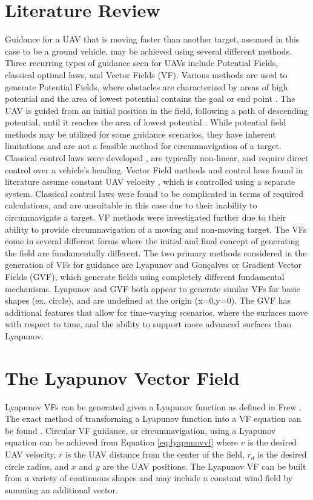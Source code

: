 \documentclass[conf]{new-aiaa}
\begin{document}
\section{Literature Review}
Guidance for a UAV that is moving faster than another target, assumed in this case to be a ground vehicle, may be achieved using several different methods. Three recurring types of guidance seen for UAVs include Potential Fields, classical optimal laws, and Vector Fields (VF). Various methods are used to generate Potential Fields, where obstacles are characterized by areas of high potential and the area of lowest potential contains the goal or end point {\cite{goerzen2010survey}}. The UAV is guided from an initial position in the field, following a path of descending potential, until it reaches the area of lowest potential {\cite{goerzen2010survey}}. While potential field methods may be utilized for some guidance scenarios, they have inherent limitations {\cite{koren1991potential}} and are not a feasible method for circumnavigation of a target. Classical control laws were developed {\cite{oliveira2016moving,kaminer1998trajectory}}, are typically non-linear, and require direct control over a vehicle's heading. Vector Field methods and control laws found in literature assume constant UAV velocity {\cite{chen2009tracking}}, which is controlled using a separate system. Classical control laws were found to be complicated in terms of required calculations, and are unsuitable in this case due to their inability to circumnavigate a target. VF methods were investigated further due to their ability to provide circumnavigation of a moving and non-moving target. The VFs come in several different forms where the initial and final concept of generating the field are fundamentally different. The two primary methods considered in the generation of VFs for guidance are Lyapunov {\cite{frew_tracking_2012}} and Gon\c{c}alves {\cite{goncalves_circulation_2010}} or Gradient Vector Fields (GVF), which generate fields using completely different fundamental mechanisms. Lyapunov and GVF both appear to generate similar VFs for basic shapes (ex, circle), and are undefined at the origin (x=0,y=0). The GVF has additional features that allow for time-varying scenarios, where the surfaces move with respect to time, and the ability to support more advanced surfaces than Lyapunov.

\section{The Lyapunov Vector Field}
Lyapunov VFs can be generated given a Lyapunov function as defined in Frew {\cite{frew_tracking_2012}}. The exact method of transforming a Lyapunov function into a VF equation can be found {\cite{rosier1992homogeneous,chen2013uav,chen2009tracking}}. Circular VF guidance, or circumnavigation, using a Lyapunov equation can be achieved from Equation \ref{eq:lyapunovvf} where $v$ is the desired UAV velocity, $r$ is the UAV distance from the center of the field, $r_d$ is the desired circle radius, and $x$ and $y$ are the UAV positions. The Lyapunov VF can be built from a variety of continuous shapes and may include a constant wind field by summing an additional vector.
\end{document}
